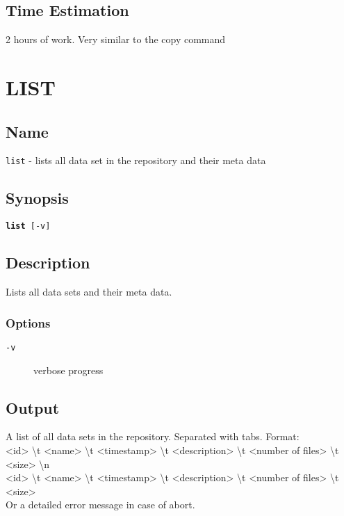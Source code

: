 \documentclass{article} %
\begin{document}
				\subsection*{Time Estimation}
				2 hours of work. Very similar to the copy command\\
				\noindent
		\newpage
		\section*{LIST}
		\subsection*{Name}
		\texttt{list} - lists all data set in the repository and their meta data
		\subsection*{Synopsis}
		\texttt{\textbf{list} [-v]}
		\subsection*{Description}
		Lists all data sets and their meta data.\\
		
		\subsubsection*{Options}
		\begin{description}
			\item[\texttt{-v}] verbose progress
		\end{description}
		
		\subsection*{Output}
		A list of all data sets in the repository. Separated with tabs. Format:\\<id> \textbackslash t <name> \textbackslash t <timestamp> \textbackslash t <description> \textbackslash t <number of files> \textbackslash t <size> \textbackslash n \\<id> \textbackslash t <name> \textbackslash t <timestamp> \textbackslash t <description> \textbackslash t <number of files> \textbackslash t <size>\\
		Or a detailed error message in case of abort.
\end{document}
